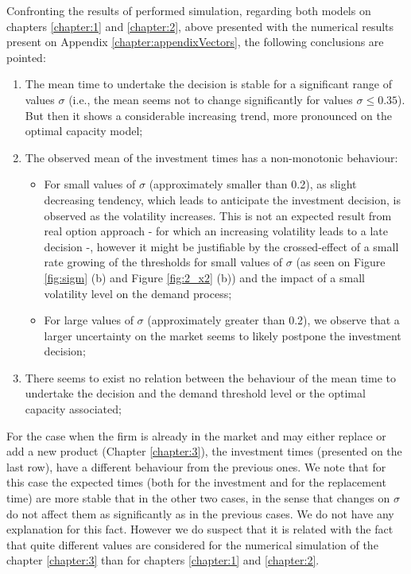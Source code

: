 Confronting the results of performed simulation, regarding both models on chapters \ref{chapter:1} and \ref{chapter:2}, above presented with the numerical results present on Appendix \ref{chapter:appendixVectors}, the following conclusions are pointed:
\begin{enumerate}
	
	
	
	\item The mean time to undertake the decision is stable for a significant range of values $\sigma$ (i.e., the mean seems not to change significantly for values $\sigma \leq 0.35$). But then it shows a considerable increasing trend, more pronounced on the optimal capacity model;
	
	\item  The observed mean of the investment times has a non-monotonic behaviour:
	 \begin{itemize}
	 	\item For small values of $\sigma$ (approximately smaller than 0.2),  as slight decreasing tendency, which leads to anticipate the investment decision, is observed as the volatility increases. This is not an expected result from real option approach - for which an increasing volatility leads to a late decision \cite{dixit:book} -, however it might be justifiable by the crossed-effect of a small rate growing of the thresholds for small values of $\sigma$ (as seen on Figure \ref{fig:sigm} (b) and Figure \ref{fig:2_x2} (b)) and the impact of a small volatility level on the demand process; 
	 	\item For large values of $\sigma$ (approximately greater than 0.2), we observe that a larger uncertainty on the market seems to likely postpone the investment decision;
	 \end{itemize}

	\item There seems to exist no relation between the behaviour of the mean time to undertake the decision and the demand threshold level or the optimal capacity associated;	
	
\end{enumerate}



For the case when the firm is already in the market and may either replace or add a new product (Chapter \ref{chapter:3}), the investment times (presented on the last row), have a different behaviour from the previous ones. We note that for this case the expected times (both for the investment and for the replacement time) are more stable that in the other two cases, in the sense that changes on $\sigma$ do not affect them as significantly as in the previous cases. We do not have any explanation for this fact. However we do suspect that it is related with the fact that quite different values are considered for the numerical simulation of the chapter \ref{chapter:3} than for chapters \ref{chapter:1} and \ref{chapter:2}.  


